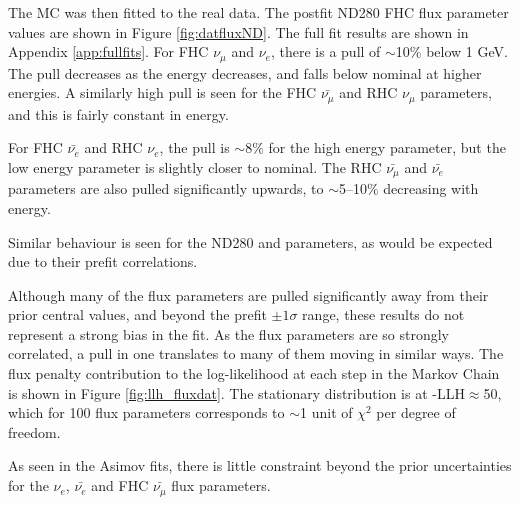 The MC was then fitted to the real data. The postfit ND280 FHC flux parameter values are shown in Figure \ref{fig:datfluxND}. The full fit results are shown in Appendix \ref{app:fullfits}. For FHC $\nu_{\mu}$ and $\nu_e$, there is a pull of $\sim$10$\%$ below 1 GeV. The pull decreases as the energy decreases, and falls below nominal at higher energies. A similarly high pull is seen for the FHC $\bar{\nu_{\mu}}$ and RHC $\nu_{\mu}$ parameters, and this is fairly constant in energy.

For FHC $\bar{\nu_e}$ and RHC $\nu_e$, the pull is $\sim$8$\%$ for the high energy parameter, but the low energy parameter is slightly closer to nominal. The RHC $\bar{\nu_{\mu}}$ and $\bar{\nu_e}$ parameters are also pulled significantly upwards, to $\sim$5--10$\%$ decreasing with energy.

Similar behaviour is seen for the ND280 and \SK parameters, as would be expected due to their prefit correlations.

Although many of the flux parameters are pulled significantly away from their prior central values, and beyond the prefit $\pm1\sigma$ range, these results do not represent a strong bias in the fit. As the flux parameters are so strongly correlated, a pull in one translates to many of them moving in similar ways. The flux penalty contribution to the log-likelihood at each step in the Markov Chain is shown in Figure \ref{fig:llh_fluxdat}. The stationary distribution is at -LLH$\approx$50, which for 100 flux parameters corresponds to $\sim$1 unit of $\chi^2$ per degree of freedom.

As seen in the Asimov fits, there is little constraint beyond the prior uncertainties for the $\nu_e$, $\bar{\nu_e}$ and FHC $\bar{\nu_{\mu}}$ flux parameters.

